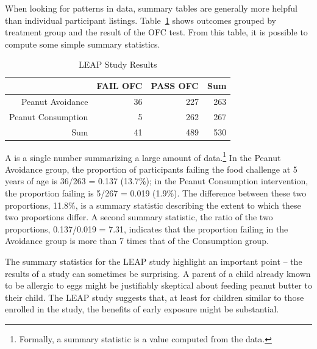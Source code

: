 \begin{doublespace}

When looking for patterns in data, summary tables are generally more helpful than individual participant listings. Table~\ref{leapStudyResults} shows outcomes grouped by treatment group and the result of the OFC test. From this table, it is possible to compute some simple summary statistics. 

\begin{table}[ht]
\centering
\begin{tabular}{rrrr}
  \hline
 & FAIL OFC & PASS OFC & Sum \\ 
  \hline
Peanut Avoidance & 36 & 227 & 263 \\ 
  Peanut Consumption & 5 & 262 & 267 \\ 
  Sum & 41 & 489 & 530 \\ 
   \hline
\end{tabular}
\caption{LEAP Study Results} 
\label{leapStudyResults}
\end{table}


A  is a single number summarizing a large amount of data.\footnote{Formally, a summary statistic is a value computed from the data.} In the Peanut Avoidance group, the proportion of participants failing the food challenge at 5 years of age is 36/263 = 0.137 (13.7\%); in the Peanut Consumption intervention, the proportion failing is 5/267 = 0.019 (1.9\%). The difference between these two proportions, 11.8\%, is a summary statistic describing the extent to which these two proportions differ. A second summary statistic, the ratio of the two proportions, 0.137/0.019 = 7.31, indicates that the proportion failing in the Avoidance group is more than 7 times that of the Consumption group.   
	
The summary statistics for the LEAP study highlight an important point -- the results of a study can sometimes be surprising.  A parent of a child already known to be allergic to eggs might be justifiably skeptical about feeding peanut butter to their child.  The LEAP study suggests that, at least for children similar to those enrolled in the study, the benefits of early exposure might be substantial. 


\end{doublespace}
